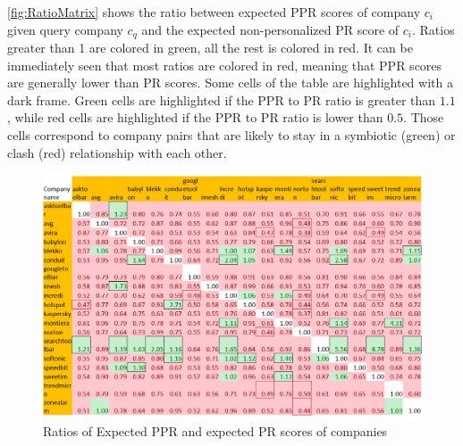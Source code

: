 \documentclass[11pt,oneside]{book}
\begin{document}

\autoref{fig:RatioMatrix} shows the ratio between expected PPR scores of company $c_i$ given query company $c_q$ and the expected non-personalized PR score of $c_i$. Ratios greater than 1 are colored in green, all the rest is colored in red. It can be immediately seen that most ratios are colored in red, meaning that PPR scores are generally lower than PR scores. Some cells of the table are highlighted with a dark frame. Green cells are highlighted if the PPR to PR ratio is greater than $1.1$, while red cells are highlighted if the PPR to PR ratio is lower than $0.5$. Those cells correspond to company pairs that are likely to stay in a symbiotic (green) or clash (red) relationship with each other.

\begin{figure}[!htbp]
\centering
    \includegraphics[scale=0.8]{figures/RatioMatrixPortrate.png}
    \caption{Ratios of Expected PPR and expected PR scores of companies}
    \label{fig:RatioMatrix}
\end{figure}
\end{document}
